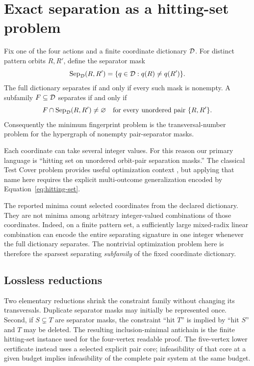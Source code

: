 \section{Exact separation as a hitting-set problem}
\label{sec:hitting-set}

Fix one of the four actions and a finite coordinate dictionary $\mathcal{D}$.
For distinct pattern orbits $R,R'$, define the separator mask
\[
  \operatorname{Sep}_{\mathcal{D}}(R,R')
  =\{q\in\mathcal{D}:q(R)\neq q(R')\}.
\]
The full dictionary separates if and only if every such mask is nonempty.  A
subfamily $F\subseteq\mathcal{D}$ separates if and only if
\begin{equation}
  F\cap\operatorname{Sep}_{\mathcal{D}}(R,R')\neq\varnothing
  \quad\text{for every unordered pair }\{R,R'\}.
  \label{eq:hitting-set}
\end{equation}
Consequently the minimum fingerprint problem is the transversal-number
problem for the hypergraph of nonempty pair-separator masks.

Each coordinate can take several integer values.  For this reason our primary
language is ``hitting set on unordered orbit-pair separation masks.''  The
classical Test Cover problem provides useful optimization context
\cite{DeBontridderEtAl2003}, but applying that name here requires the explicit
multi-outcome generalization encoded by Equation~\eqref{eq:hitting-set}.

The reported minima count selected coordinates from the declared dictionary.
They are not minima among arbitrary integer-valued combinations of those
coordinates.  Indeed, on a finite pattern set, a sufficiently large
mixed-radix linear combination can encode the entire separating signature in
one integer whenever the full dictionary separates.  The nontrivial
optimization problem here is therefore the sparsest separating
\emph{subfamily} of the fixed coordinate dictionary.

\subsection{Lossless reductions}

Two elementary reductions shrink the constraint family without changing its
transversals.  Duplicate separator masks may initially be represented once.
Second, if $S\subsetneq T$ are separator masks, the constraint ``hit $T$'' is
implied by ``hit $S$'' and $T$ may be deleted.  The resulting inclusion-minimal
antichain is the finite hitting-set instance used for the four-vertex readable
proof.  The five-vertex lower certificate instead uses a selected explicit
pair core; infeasibility of that core at a given budget implies infeasibility
of the complete pair system at the same budget.

